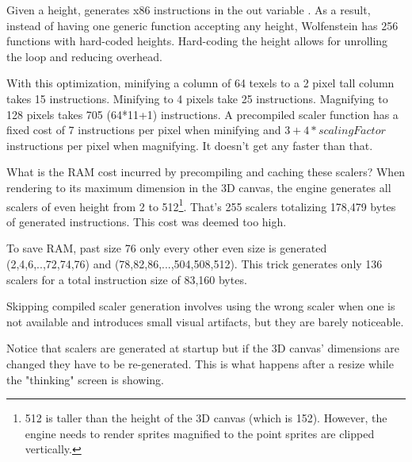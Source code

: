 \par
\begin{minipage}{\textwidth}

\end{minipage}
\par
Given a height,  generates x86 instructions in the out variable . As a result, instead of having one generic function accepting any height,  Wolfenstein has 256 functions with hard-coded heights. Hard-coding the height allows for unrolling the loop and reducing overhead.\\
\par
With this optimization, minifying a column of 64 texels to a 2 pixel tall column takes 15 instructions. Minifying to 4 pixels take 25 instructions. Magnifying to 128 pixels takes 705 (64*11+1) instructions. A precompiled scaler function has a fixed cost of 7 instructions per pixel when minifying and $3+4*scalingFactor$ instructions per pixel when magnifying. It doesn't get any faster than that.\\
\par
What is the RAM cost incurred by precompiling and caching these scalers? When rendering to its maximum dimension in the 3D canvas, the engine generates all scalers of even height from 2 to 512\footnote{512 is taller than the height of the 3D canvas (which is 152). However, the engine needs to render sprites magnified to the point sprites are clipped vertically.}. That's 255 scalers totalizing 178,479 bytes of generated instructions. This cost was deemed too high.\\
\par 
To save RAM, past size 76 only every other even size is generated (2,4,6,..,72,74,76) and (78,82,86,...,504,508,512). This trick generates only 136 scalers for a total instruction size of 83,160 bytes.\\
\par
Skipping compiled scaler generation involves using the wrong scaler when one is not available and introduces small visual artifacts, but they are barely noticeable.\\
\par
Notice that scalers are generated at startup but if the 3D canvas' dimensions are changed they have to be re-generated. This is what happens after a resize while the "thinking" screen is showing.
\begin{figure}[H]
 \centering
\end{figure}








